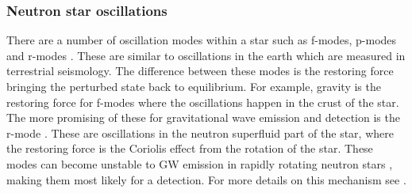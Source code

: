  \subsubsection{Neutron star oscillations}
There are a number of oscillation modes within a star such as f-modes, p-modes
and r-modes \citep{becker2009NeutronStars}.  These are similar to oscillations
in the earth which are measured in terrestrial seismology.  The difference
between these modes is the restoring force bringing the perturbed state back to
equilibrium.  For example, gravity is the restoring force for f-modes where the
oscillations happen in the crust of the star.  The more promising of these for
gravitational wave emission and detection is the r-mode
\citep{lasky2015GravitationalWaves}.  These are oscillations in the neutron
superfluid part of the star, where the restoring force is the Coriolis effect
from the rotation of the star.  These modes can become unstable to \gls{GW}
emission in rapidly rotating neutron stars \citep{lasky2015GravitationalWaves},
making them most likely for a detection.  For more details on this mechanism
see
\citep{lasky2015GravitationalWaves,owen1998GravitationalWaves,jonesCFSInstability}.

